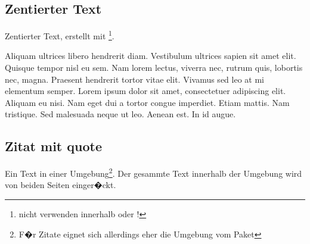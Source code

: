 \subsection{Zentierter Text}
%
Zentierter Text, erstellt mit \footnote{nicht verwenden innerhalb  oder !}.
\begin{center}
Aliquam ultrices libero hendrerit diam. Vestibulum ultrices sapien sit amet elit. Quisque tempor nisl eu sem. Nam lorem lectus, viverra nec, rutrum quis, lobortis nec, magna. Praesent hendrerit tortor vitae elit. Vivamus sed leo at mi elementum semper. Lorem ipsum dolor sit amet, consectetuer adipiscing elit. Aliquam eu nisi. Nam eget dui a tortor congue imperdiet. Etiam mattis. Nam tristique. Sed malesuada neque ut leo. Aenean est. In id augue.
\end{center}

\subsection{Zitat mit quote}
Ein Text in einer  Umgebung\footnote{F�r Zitate eignet sich allerdings eher die Umgebung  vom Paket }. Der gesammte Text innerhalb der Umgebung wird von beiden Seiten einger�ckt.

